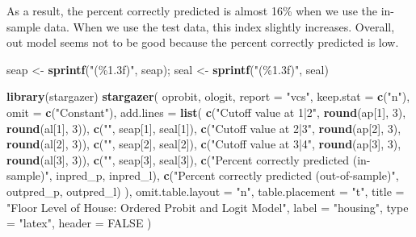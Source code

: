 \documentclass[
  12pt,
]{article}
\newenvironment{Shaded}{\begin{snugshade}}{\end{snugshade}}
\newcommand{\DataTypeTok}[1]{\textcolor[rgb]{0.13,0.29,0.53}{#1}}
\newcommand{\DecValTok}[1]{\textcolor[rgb]{0.00,0.00,0.81}{#1}}
\newcommand{\KeywordTok}[1]{\textcolor[rgb]{0.13,0.29,0.53}{\textbf{#1}}}
\newcommand{\NormalTok}[1]{#1}
\newcommand{\OtherTok}[1]{\textcolor[rgb]{0.56,0.35,0.01}{#1}}
\newcommand{\StringTok}[1]{\textcolor[rgb]{0.31,0.60,0.02}{#1}}
\begin{document}
As a result, the percent correctly predicted is almost 16\% when we use
the in-sample data. When we use the test data, this index slightly
increases. Overall, out model seems not to be good because the percent
correctly predicted is low.

\begin{Shaded}
\begin{Highlighting}[]
\NormalTok{seap \textless{}{-}}\StringTok{ }\KeywordTok{sprintf}\NormalTok{(}\StringTok{"(\%1.3f)"}\NormalTok{, seap); seal \textless{}{-}}\StringTok{ }\KeywordTok{sprintf}\NormalTok{(}\StringTok{"(\%1.3f)"}\NormalTok{, seal)}

\KeywordTok{library}\NormalTok{(stargazer)}
\KeywordTok{stargazer}\NormalTok{(}
\NormalTok{  oprobit, ologit,}
  \DataTypeTok{report =} \StringTok{"vcs"}\NormalTok{, }\DataTypeTok{keep.stat =} \KeywordTok{c}\NormalTok{(}\StringTok{"n"}\NormalTok{),}
  \DataTypeTok{omit =} \KeywordTok{c}\NormalTok{(}\StringTok{"Constant"}\NormalTok{),}
  \DataTypeTok{add.lines =} \KeywordTok{list}\NormalTok{(}
    \KeywordTok{c}\NormalTok{(}\StringTok{"Cutoff value at 1|2"}\NormalTok{, }\KeywordTok{round}\NormalTok{(ap[}\DecValTok{1}\NormalTok{], }\DecValTok{3}\NormalTok{), }\KeywordTok{round}\NormalTok{(al[}\DecValTok{1}\NormalTok{], }\DecValTok{3}\NormalTok{)),}
    \KeywordTok{c}\NormalTok{(}\StringTok{""}\NormalTok{, seap[}\DecValTok{1}\NormalTok{], seal[}\DecValTok{1}\NormalTok{]),}
    \KeywordTok{c}\NormalTok{(}\StringTok{"Cutoff value at 2|3"}\NormalTok{, }\KeywordTok{round}\NormalTok{(ap[}\DecValTok{2}\NormalTok{], }\DecValTok{3}\NormalTok{), }\KeywordTok{round}\NormalTok{(al[}\DecValTok{2}\NormalTok{], }\DecValTok{3}\NormalTok{)),}
    \KeywordTok{c}\NormalTok{(}\StringTok{""}\NormalTok{, seap[}\DecValTok{2}\NormalTok{], seal[}\DecValTok{2}\NormalTok{]),}
    \KeywordTok{c}\NormalTok{(}\StringTok{"Cutoff value at 3|4"}\NormalTok{, }\KeywordTok{round}\NormalTok{(ap[}\DecValTok{3}\NormalTok{], }\DecValTok{3}\NormalTok{), }\KeywordTok{round}\NormalTok{(al[}\DecValTok{3}\NormalTok{], }\DecValTok{3}\NormalTok{)),}
    \KeywordTok{c}\NormalTok{(}\StringTok{""}\NormalTok{, seap[}\DecValTok{3}\NormalTok{], seal[}\DecValTok{3}\NormalTok{]),}
    \KeywordTok{c}\NormalTok{(}\StringTok{"Percent correctly predicted (in{-}sample)"}\NormalTok{, inpred\_p, inpred\_l),}
    \KeywordTok{c}\NormalTok{(}\StringTok{"Percent correctly predicted (out{-}of{-}sample)"}\NormalTok{, outpred\_p, outpred\_l)}
\NormalTok{  ),}
  \DataTypeTok{omit.table.layout =} \StringTok{"n"}\NormalTok{, }\DataTypeTok{table.placement =} \StringTok{"t"}\NormalTok{,}
  \DataTypeTok{title =} \StringTok{"Floor Level of House: Ordered Probit and Logit Model"}\NormalTok{,}
  \DataTypeTok{label =} \StringTok{"housing"}\NormalTok{,}
  \DataTypeTok{type =} \StringTok{"latex"}\NormalTok{, }\DataTypeTok{header =} \OtherTok{FALSE}
\NormalTok{)}
\end{Highlighting}
\end{Shaded}
\end{document}
